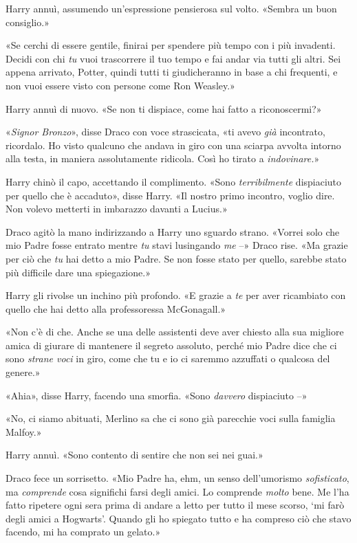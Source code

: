Harry annuì, assumendo un’espressione pensierosa sul volto. «Sembra un buon consiglio.»

«Se cerchi di essere gentile, finirai per spendere più tempo con i più invadenti. Decidi con chi \textit{tu} vuoi trascorrere il tuo tempo e fai andar via tutti gli altri. Sei appena arrivato, Potter, quindi tutti ti giudicheranno in base a chi frequenti, e non vuoi essere visto con persone come Ron Weasley.»

Harry annuì di nuovo. «Se non ti dispiace, come hai fatto a riconoscermi?»

«\textit{Signor Bronzo}», disse Draco con voce strascicata, «ti avevo \textit{già} incontrato, ricordalo. Ho visto qualcuno che andava in giro con una sciarpa avvolta intorno alla testa, in maniera assolutamente ridicola. Così ho tirato a \textit{indovinare.}»

Harry chinò il capo, accettando il complimento. «Sono \textit{terribilmente} dispiaciuto per quello che è accaduto», disse Harry. «Il nostro primo incontro, voglio dire. Non volevo metterti in imbarazzo davanti a Lucius.»

Draco agitò la mano indirizzando a Harry uno sguardo strano. «Vorrei solo che mio Padre fosse entrato mentre \textit{tu} stavi lusingando \textit{me} –» Draco rise. «Ma grazie per ciò che \textit{tu} hai detto a mio Padre. Se non fosse stato per quello, sarebbe stato più difficile dare una spiegazione.»

Harry gli rivolse un inchino più profondo. «E grazie a \textit{te} per aver ricambiato con quello che hai detto alla professoressa McGonagall.»

«Non c’è di che. Anche se una delle assistenti deve aver chiesto alla sua migliore amica di giurare di mantenere il segreto assoluto, perché mio Padre dice che ci sono \textit{strane voci} in giro, come che tu e io ci saremmo azzuffati o qualcosa del genere.»

«Ahia», disse Harry, facendo una smorfia. «Sono \textit{davvero} dispiaciuto –»

«No, ci siamo abituati, Merlino sa che ci sono già parecchie voci sulla famiglia Malfoy.»

Harry annuì. «Sono contento di sentire che non sei nei guai.»

Draco fece un sorrisetto. «Mio Padre ha, ehm, un senso dell’umorismo \textit{sofisticato}, ma \textit{comprende} cosa significhi farsi degli amici. Lo comprende \textit{molto} bene. Me l’ha fatto ripetere ogni sera prima di andare a letto per tutto il mese scorso, ‘mi farò degli amici a Hogwarts’. Quando gli ho spiegato tutto e ha compreso ciò che stavo facendo, mi ha comprato un gelato.»

